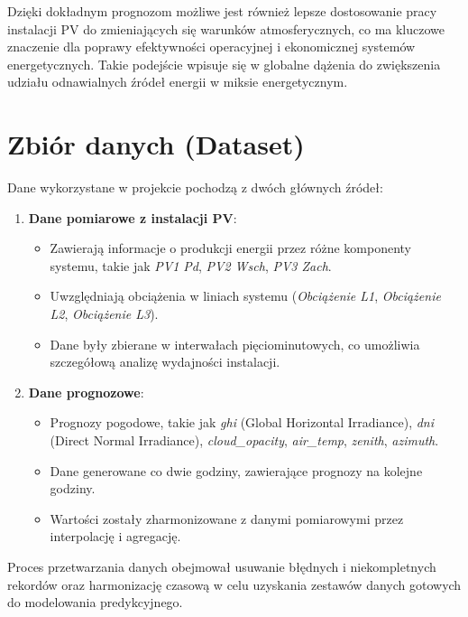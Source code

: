 \documentclass[a4paper,fleqn,final]{cas-dc}\usepackage[authoryear,longnamesfirst]{natbib}
\begin{document}
Dzięki dokładnym prognozom możliwe jest również lepsze dostosowanie pracy instalacji PV do zmieniających się warunków atmosferycznych, co ma kluczowe znaczenie dla poprawy efektywności operacyjnej i ekonomicznej systemów energetycznych. Takie podejście wpisuje się w globalne dążenia do zwiększenia udziału odnawialnych źródeł energii w miksie energetycznym.


\section{Zbiór danych (Dataset)}

Dane wykorzystane w projekcie pochodzą z dwóch głównych źródeł:
\begin{enumerate}
    \item \textbf{Dane pomiarowe z instalacji PV}:
    \begin{itemize}
        \item Zawierają informacje o produkcji energii przez różne komponenty systemu, takie jak \textit{PV1 Pd}, \textit{PV2 Wsch}, \textit{PV3 Zach}.
        \item Uwzględniają obciążenia w liniach systemu (\textit{Obciążenie L1}, \textit{Obciążenie L2}, \textit{Obciążenie L3}).
        \item Dane były zbierane w interwałach pięciominutowych, co umożliwia szczegółową analizę wydajności instalacji.
    \end{itemize}

    \item \textbf{Dane prognozowe}:
    \begin{itemize}
        \item Prognozy pogodowe, takie jak \textit{ghi} (Global Horizontal Irradiance), \textit{dni} (Direct Normal Irradiance), \textit{cloud\_opacity}, \textit{air\_temp}, \textit{zenith}, \textit{azimuth}.
        \item Dane generowane co dwie godziny, zawierające prognozy na kolejne godziny.
        \item Wartości zostały zharmonizowane z danymi pomiarowymi przez interpolację i agregację.
    \end{itemize}
\end{enumerate}

Proces przetwarzania danych obejmował usuwanie błędnych i niekompletnych rekordów oraz harmonizację czasową w celu uzyskania zestawów danych gotowych do modelowania predykcyjnego.
\end{document}

